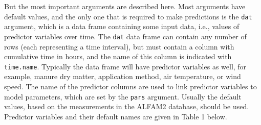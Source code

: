 \documentclass{article}
\begin{document}
\begin{knitrout}
\color{fgcolor}\begin{kframe}
\begin{alltt}
\end{alltt}
\end{kframe}
\end{knitrout}

But the most important arguments are described here.
Most arguments have default values, and the only one that is required to make predictions is the \texttt{dat} argument, which is a data frame containing some input data, i.e., values of predictor variables over time.
The \texttt{dat} data frame can contain any number of rows (each representing a time interval), but must contain a column with cumulative time in hours, and the name of this column is indicated with \texttt{time.name}.
Typically the data frame will have predictor variables as well, for example, manure dry matter, application method, air temperature, or wind speed.
The name of the predictor columns are used to link predictor variables to model parameters, which are set by the \texttt{pars} argument. 
Usually the default values, based on the measurements in the ALFAM2 database, should be used.
Predictor variables and their default names are given in Table 1 below.
\end{document}
